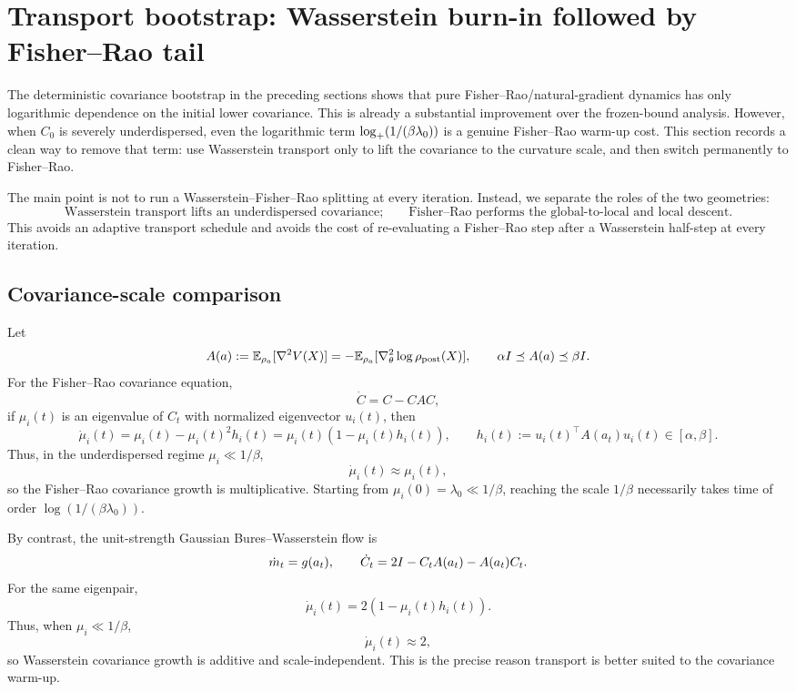 \section{Transport bootstrap: Wasserstein burn-in followed by Fisher--Rao tail}
\label{sec:transport-bootstrap}

The deterministic covariance bootstrap in the preceding sections shows that pure
Fisher--Rao/natural-gradient dynamics has only logarithmic dependence on the initial lower
covariance. This is already a substantial improvement over the frozen-bound analysis. However,
when $C_0$ is severely underdispersed, even the logarithmic term
$\log_+(1/(\beta\lambda_0))$ is a genuine Fisher--Rao warm-up cost. This section records a
clean way to remove that term: use Wasserstein transport only to lift the covariance to the
curvature scale, and then switch permanently to Fisher--Rao.

The main point is not to run a Wasserstein--Fisher--Rao splitting at every iteration. Instead, we
separate the roles of the two geometries:
\[
    \boxed{
    \text{Wasserstein transport lifts an underdispersed covariance;} \qquad
    \text{Fisher--Rao performs the global-to-local and local descent.}
    }
\]
This avoids an adaptive transport schedule and avoids the cost of re-evaluating a Fisher--Rao
step after a Wasserstein half-step at every iteration.

\subsection{Covariance-scale comparison}

Let
\[
    A(a):=\mathbb{E}_{\rho_a}[\nabla^2V(X)]
    =-\mathbb{E}_{\rho_a}[\nabla_\theta^2\log\rho_{\mathrm{post}}(X)],
    \qquad
    \alpha I\preceq A(a)\preceq\beta I.
\]
For the Fisher--Rao covariance equation,
\[
    \dot C=C-CAC,
\]
if $\mu_i(t)$ is an eigenvalue of $C_t$ with normalized eigenvector $u_i(t)$, then
\[
    \dot\mu_i(t)
    =\mu_i(t)-\mu_i(t)^2h_i(t)
    =\mu_i(t)(1-\mu_i(t)h_i(t)),
    \qquad
    h_i(t):=u_i(t)^\top A(a_t)u_i(t)\in[\alpha,\beta].
\]
Thus, in the underdispersed regime $\mu_i\ll1/\beta$,
\[
    \dot\mu_i(t)\approx \mu_i(t),
\]
so the Fisher--Rao covariance growth is multiplicative. Starting from
$\mu_i(0)=\lambda_0\ll1/\beta$, reaching the scale $1/\beta$ necessarily takes time of order
$\log(1/(\beta\lambda_0))$.

By contrast, the unit-strength Gaussian Bures--Wasserstein flow is
\begin{equation}
\label{eq:W-flow}
    \dot m_t=g(a_t),
    \qquad
    \dot C_t=2I-C_tA(a_t)-A(a_t)C_t.
\end{equation}
For the same eigenpair,
\[
    \dot\mu_i(t)=2(1-\mu_i(t)h_i(t)).
\]
Thus, when $\mu_i\ll1/\beta$,
\[
    \dot\mu_i(t)\approx2,
\]
so Wasserstein covariance growth is additive and scale-independent. This is the precise
reason transport is better suited to the covariance warm-up.

